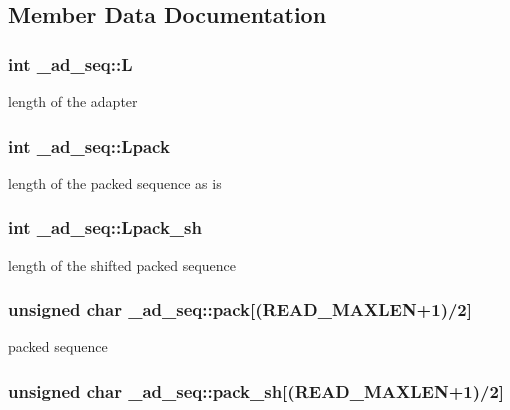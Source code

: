 \subsection{Member Data Documentation}
\hypertarget{struct__ad__seq_a99597df3a93bd8d1634909ffffb34982}{
\subsubsection[{L}]{\setlength{\rightskip}{0pt plus 5cm}int \+\_\+ad\+\_\+seq\+::\+L}}\label{struct__ad__seq_a99597df3a93bd8d1634909ffffb34982}
length of the adapter \hypertarget{struct__ad__seq_a3a0b2eebf83159fd543222389cce34f0}{
\subsubsection[{Lpack}]{\setlength{\rightskip}{0pt plus 5cm}int \+\_\+ad\+\_\+seq\+::\+Lpack}}\label{struct__ad__seq_a3a0b2eebf83159fd543222389cce34f0}
length of the packed sequence as is \hypertarget{struct__ad__seq_a04e987ac89615883c9a3b0f4ca36628b}{
\subsubsection[{Lpack\+\_\+sh}]{\setlength{\rightskip}{0pt plus 5cm}int \+\_\+ad\+\_\+seq\+::\+Lpack\+\_\+sh}}\label{struct__ad__seq_a04e987ac89615883c9a3b0f4ca36628b}
length of the shifted packed sequence \hypertarget{struct__ad__seq_acd1a87d098771d769affe62ee07d25ac}{
\subsubsection[{pack}]{\setlength{\rightskip}{0pt plus 5cm}unsigned char \+\_\+ad\+\_\+seq\+::pack\mbox{[}(R\+E\+A\+D\+\_\+\+M\+A\+X\+L\+E\+N+1)/2\mbox{]}}}\label{struct__ad__seq_acd1a87d098771d769affe62ee07d25ac}
packed sequence \hypertarget{struct__ad__seq_af631e16eb58ee89fc2bc82a89992ef4b}{
\subsubsection[{pack\+\_\+sh}]{\setlength{\rightskip}{0pt plus 5cm}unsigned char \+\_\+ad\+\_\+seq\+::pack\+\_\+sh\mbox{[}(R\+E\+A\+D\+\_\+\+M\+A\+X\+L\+E\+N+1)/2\mbox{]}}}\label{struct__ad__seq_af631e16eb58ee89fc2bc82a89992ef4b}
